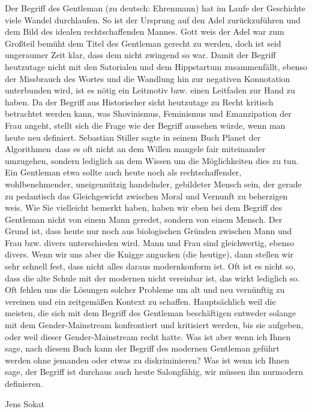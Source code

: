  Der Begriff des Gentleman (zu deutsch: Ehrenmann) hat im Laufe der Geschichte viele Wandel durchlaufen. 
So ist der Ursprung auf den Adel zurückzuführen und dem Bild des idealen rechtschaffenden Mannes. 
Gott weis der Adel war zum Großteil bemüht dem Titel des Gentleman gerecht zu werden, doch ist seid ungeraumer Zeit klar, 
dass dem nicht zwingend so war. Damit der Begriff heutzutage nicht mit den Satorialen und dem Hippstartum zusammenfällt,
ebenso der Missbrauch des Wortes und die Wandlung hin zur negativen Konnotation unterbunden wird, ist es nötig ein Leitmotiv bzw. 
einen Leitfaden zur Hand zu haben. Da der Begriff aus Historischer sicht heutzutage zu Recht kritisch betrachtet werden kann, was Shovinismus,
Feminismus und Emanzipation der Frau angeht, stellt sich die Frage wie der Begriff aussehen würde, wenn man heute neu definiert.
Sebastian Stiller sagte in seinem Buch \glqq Planet der Algorithmen\grqq \, dass es oft nicht an dem Willen mangele
fair miteinander umzugehen, sondern lediglich an dem Wissen um die Möglichkeiten dies zu tun.
Ein Gentleman etwa sollte auch heute noch als rechtschaffender, wohlbenehmender, uneigennützig handelnder, 
gebildeter Mensch sein, der gerade zu pedantisch das Gleichgewicht zwischen Moral und Vernunft zu beherzigen weis.
Wie Sie vielleicht bemerkt haben, haben wir eben bei dem Begriff des Gentleman nicht von einem Mann geredet,
sondern von einem Mensch. Der Grund ist, dass heute nur noch aus biologischen Gründen zwischen Mann und Frau bzw. divers
unterschieden wird. Mann und Frau sind gleichwertig, ebenso divers. Wenn wir uns aber die Knigge angucken (die heutige),
dann stellen wir sehr schnell fest, dass nicht alles daraus modernkonform ist. Oft ist es nicht so, dass die alte Schule mit
der modernen nicht vereinbar ist, das wirkt lediglich so. Oft fehlen uns die Lösungen solcher Probleme um alt und neu vernünftig
zu vereinen und ein zeitgemäßen Kontext zu schaffen. Hauptsächlich weil die meisten, die sich mit dem Begriff des Gentleman beschäftigen
entweder solange mit dem Gender-Mainstream konfrontiert und kritisiert werden, bis sie aufgeben, oder weil dieser Gender-Mainstream
recht hatte. Was ist aber wenn ich Ihnen sage, nach diesem Buch kann der Begriff des modernen Gentleman geführt werden ohne jemanden
oder etwas zu diskriminieren? Was ist wenn ich Ihnen sage, der Begriff ist durchaus auch heute Salongfähig, wir müssen ihn nurmodern definieren.


Jens Sokat


